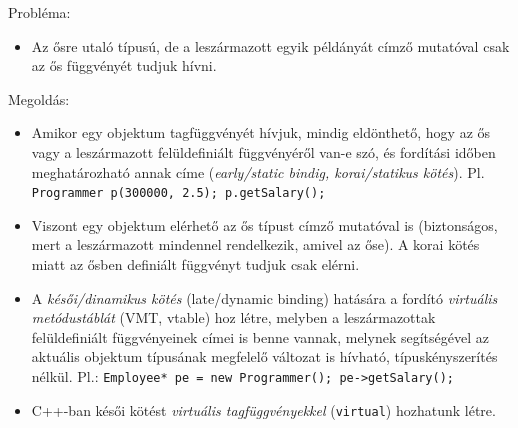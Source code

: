 \begin{frame}
    Probléma:
    \begin{itemize}
        \footnotesize
        \item Az ősre utaló típusú, de a leszármazott egyik példányát címző mutatóval csak az ős függvényét tudjuk hívni.
    \end{itemize}
    Megoldás:
    \begin{itemize}
        \footnotesize
        \item Amikor egy objektum tagfüggvényét hívjuk, mindig eldönthető, hogy az ős vagy a leszármazott felüldefiniált függvényéről van-e szó, és fordítási időben meghatározható annak címe (\emph{early/static bindig, korai/statikus kötés}). Pl. \texttt{Programmer p(300000, 2.5); p.getSalary();}
        \item Viszont egy objektum elérhető az ős típust címző mutatóval is (biztonságos, mert a leszármazott mindennel rendelkezik, amivel az őse). A korai kötés miatt az ősben definiált függvényt tudjuk csak elérni.
        \item A \emph{késői/dinamikus kötés} (late/dynamic binding) hatására a fordító \emph{virtuális metódustáblát} (VMT, vtable) hoz létre, melyben a leszármazottak felüldefiniált függvényeinek címei is benne vannak, melynek segítségével az aktuális objektum típusának megfelelő változat is hívható, típuskényszerítés nélkül. Pl.: \texttt{Employee* pe = new Programmer(); pe->getSalary();}
        \item C++-ban késői kötést \emph{virtuális tagfüggvényekkel} (\texttt{virtual}) hozhatunk létre.
    \end{itemize}
\end{frame}

\begin{frame}
    \begin{columns}[T]
            \begin{exampleblock}{}
                \vspace{-.2cm}
                \fontsize{7}{8} \selectfont
                
                \vspace{-.2cm}
            \end{exampleblock}
            \begin{exampleblock}{}
                \vspace{-.2cm}
                \fontsize{7}{8} \selectfont
                
                \vspace{-.2cm}
            \end{exampleblock}
    \end{columns}
\end{frame}

